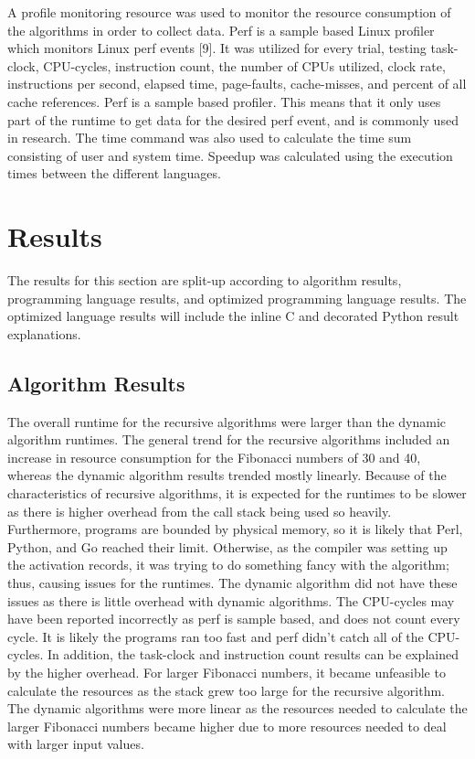 \documentclass{sig-alternate}
\begin{document}
A profile monitoring resource was used to monitor the resource consumption of the algorithms in order to collect data. Perf is a sample based Linux profiler which monitors Linux perf events [9]. It was utilized for every trial, testing task-clock, CPU-cycles, instruction count, the number of CPUs utilized, clock rate, instructions per second, elapsed time, page-faults, cache-misses, and percent of all cache references. Perf is a sample based profiler. This means that it only uses part of the runtime to get data for the desired perf event, and is commonly used in research. The time command was also used to calculate the time sum consisting of user and system time. Speedup was calculated using the execution times between the different languages.

\section{Results}

The results for this section are split-up according to algorithm results, programming language results, and optimized programming language results. The optimized language results will include the inline C and decorated Python result explanations.

\subsection{Algorithm Results}

The overall runtime for the recursive algorithms were larger than the dynamic algorithm runtimes. The general trend for the recursive algorithms included an increase in resource consumption for the Fibonacci numbers of 30 and 40, whereas the dynamic algorithm results trended mostly linearly. Because of the characteristics of recursive algorithms, it is expected for the runtimes to be slower as there is higher overhead from the call stack being used so heavily. Furthermore, programs are bounded by physical memory, so it is likely that Perl, Python, and Go reached their limit. Otherwise, as the compiler was setting up the activation records, it was trying to do something fancy with the algorithm; thus, causing issues for the runtimes. The dynamic algorithm did not have these issues as there is little overhead with dynamic algorithms. The CPU-cycles may have been reported incorrectly as perf is sample based, and does not count every cycle. It is likely the programs ran too fast and perf didn’t catch all of the CPU-cycles. In addition, the task-clock and instruction count results can be explained by the higher overhead. For larger Fibonacci numbers, it became unfeasible to calculate the resources as the stack grew too large for the recursive algorithm. The dynamic algorithms were more linear as the resources needed to calculate the larger Fibonacci numbers became higher due to more resources needed to deal with larger input values.
\end{document}
